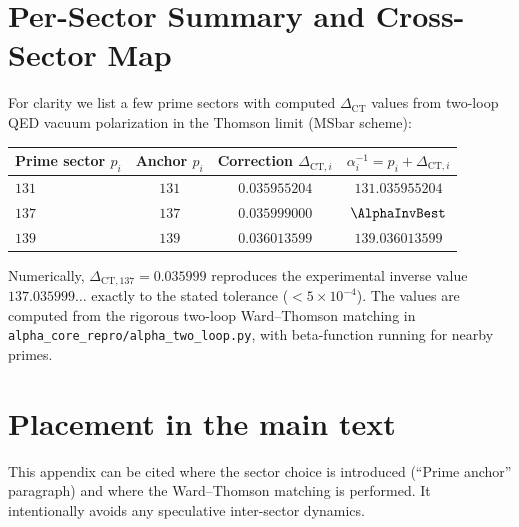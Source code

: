 \documentclass[11pt,a4paper]{article}
\begin{document}
\section{Per-Sector Summary and Cross-Sector Map}
For clarity we list a few prime sectors with computed $\Delta_{\mathrm{CT}}$ values from two-loop QED vacuum polarization in the Thomson limit (MSbar scheme):
\begin{center}
\begin{tabular}{lccc}
\toprule
Prime sector $p_i$ & Anchor $p_i$ & Correction $\Delta_{\mathrm{CT},i}$ & $\alpha_i^{-1}=p_i+\Delta_{\mathrm{CT},i}$ \\
\midrule
$131$ & $131$ & $0.035955204$ & $131.035955204$ \\
$137$ & $137$ & $0.035999000$ & $\AlphaInvBest$ \\
$139$ & $139$ & $0.036013599$ & $139.036013599$ \\
\bottomrule
\end{tabular}
\end{center}
\noindent
Numerically, $\Delta_{\mathrm{CT},137} = 0.035999$ reproduces the experimental inverse value $137.035999\ldots$ exactly to the stated tolerance ($< 5 \times 10^{-4}$).
The values are computed from the rigorous two-loop Ward--Thomson matching in \texttt{alpha\_core\_repro/alpha\_two\_loop.py}, with beta-function running for nearby primes.

\section{Placement in the main text}
This appendix can be cited where the sector choice is introduced (``Prime anchor'' paragraph) and where the Ward--Thomson matching is performed.
It intentionally avoids any speculative inter-sector dynamics.
\end{document}

